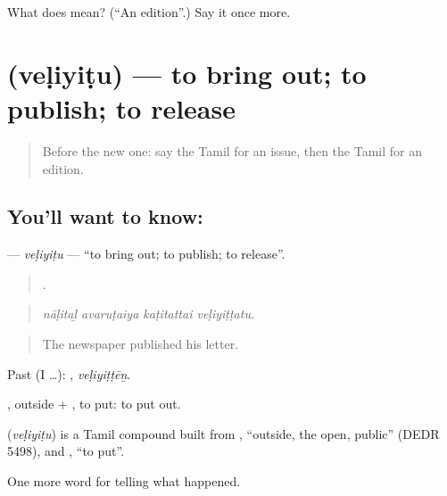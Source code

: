 \begin{tcolorbox}[breakable,colback=teal!4,colframe=teal!35!black,title={Before you move on}]
What does  mean? (\textquotedblleft{}An edition\textquotedblright{}.) Say it once more.
\end{tcolorbox}
\section[\texorpdfstring{\ta{வெளியிடு} (veḷiyiṭu)}{வெளியிடு (veḷiyiṭu)}]{ (veḷiyiṭu) — to bring out; to publish; to release}

\label{lesson:TA-C306-veliyitu}



\begin{quote}
Before the new one: say the Tamil for an issue, then the Tamil for an edition.
\end{quote}

\subsection*{You'll want to know: }
\textbf{} — \emph{veḷiyiṭu} — \textquotedblleft{}to bring out; to publish; to release\textquotedblright{}.

\begin{quote}
   .
\end{quote}

\begin{quote}
\emph{nāḷitaḻ avaruṭaiya kaṭitattai veḷiyiṭṭatu.}
\end{quote}

\begin{quote}
The newspaper published his letter.
\end{quote}

Past (I …): , \emph{veḷiyiṭṭēṉ}.

, outside + , to put: to put out.

\begin{cousinweb}
\textbf{} (\emph{veḷiyiṭu}) is a Tamil compound built from , \textquotedblleft{}outside, the open, public\textquotedblright{} (DEDR 5498), and , \textquotedblleft{}to put\textquotedblright{}.
\end{cousinweb}

\begin{grammarlens}[title={What you've built}]
One more word for telling what happened.
\end{grammarlens}

